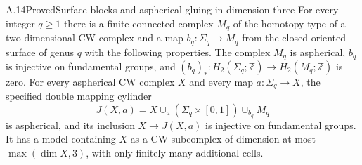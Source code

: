 \begin{claim}{A.14}{Proved}{Surface blocks and aspherical gluing in dimension three}
For every integer $q\geq1$ there is a finite connected complex $M_q$
of the homotopy type of a two-dimensional CW complex and a map
$b_q:\Sigma_q\to M_q$ from the closed oriented surface of genus $q$
with the following properties. The complex $M_q$ is aspherical,
$b_q$ is injective on fundamental groups, and
$(b_q)_*\colon H_2(\Sigma_q;\mathbb Z)\to H_2(M_q;\mathbb Z)$
is zero. For every aspherical CW complex $X$ and every map
$a:\Sigma_q\to X$, the specified double mapping cylinder
\[
 J(X,a)=X\cup_a(\Sigma_q\times[0,1])\cup_{b_q}M_q
\]
is aspherical, and its inclusion $X\to J(X,a)$ is injective on
fundamental groups. It has a model containing $X$ as a CW
subcomplex of dimension at most $\max(\dim X,3)$, with only
finitely many additional cells.
\end{claim}
